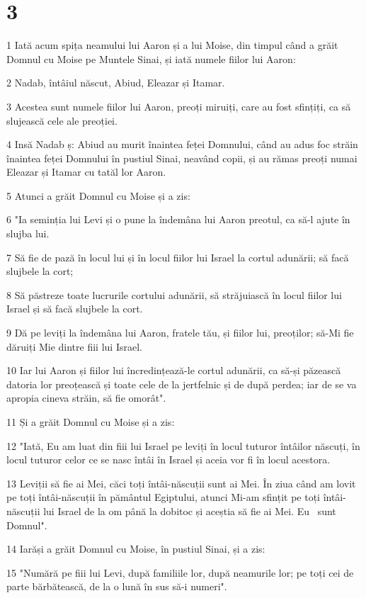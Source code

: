 \chapter{3}

\par 1 Iată acum spița neamului lui Aaron și a lui Moise, din timpul când a grăit Domnul cu Moise pe Muntele Sinai, și iată numele fiilor lui Aaron:
\par 2 Nadab, întâiul născut, Abiud, Eleazar și Itamar.
\par 3 Acestea sunt numele fiilor lui Aaron, preoți miruiți, care au fost sfințiți, ca să slujească cele ale preoției.
\par 4 Insă Nadab ș: Abiud au murit înaintea feței Domnului, când au adus foc străin înaintea feței Domnului în pustiul Sinai, neavând copii, și au rămas preoți numai Eleazar și Itamar cu tatăl lor Aaron.
\par 5 Atunci a grăit Domnul cu Moise și a zis:
\par 6 "Ia seminția lui Levi și o pune la îndemâna lui Aaron preotul, ca să-l ajute în slujba lui.
\par 7 Să fie de pază în locul lui și în locul fiilor lui Israel la cortul adunării; să facă slujbele la cort;
\par 8 Să păstreze toate lucrurile cortului adunării, să străjuiască în locul fiilor lui Israel și să facă slujbele la cort.
\par 9 Dă pe leviți la îndemâna lui Aaron, fratele tău, și fiilor lui, preoților; să-Mi fie dăruiți Mie dintre fiii lui Israel.
\par 10 Iar lui Aaron și fiilor lui încredințează-le cortul adunării, ca să-și păzească datoria lor preoțească și toate cele de la jertfelnic și de după perdea; iar de se va apropia cineva străin, să fie omorât".
\par 11 Și a grăit Domnul cu Moise și a zis:
\par 12 "Iată, Eu am luat din fiii lui Israel pe leviți în locul tuturor întâilor născuți, în locul tuturor celor ce se nasc întâi în Israel și aceia vor fi în locul acestora.
\par 13 Leviții să fie ai Mei, căci toți întâi-născuții sunt ai Mei. În ziua când am lovit pe toți întâi-născuții în pământul Egiptului, atunci Mi-am sfințit pe toți întâi-născuții lui Israel de la om până la dobitoc și aceștia să fie ai Mei. Eu  sunt Domnul".
\par 14 Iarăși a grăit Domnul cu Moise, în pustiul Sinai, și a zis:
\par 15 "Numără pe fiii lui Levi, după familiile lor, după neamurile lor; pe toți cei de parte bărbătească, de la o lună în sus să-i numeri".
